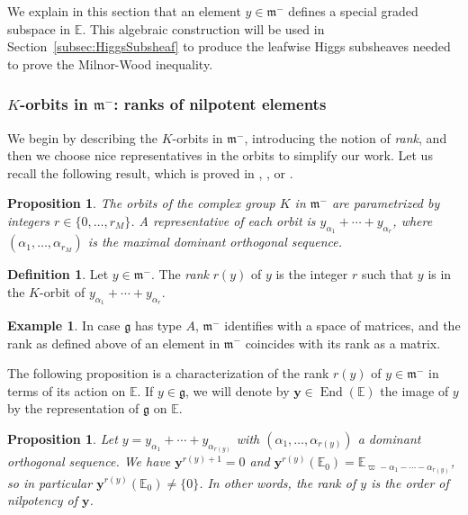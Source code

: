 \documentclass[JEP,XML,SOM,Unicode,NoFloatCountersInSection]{cedram}
\newcommand{\citestar}[3]{\cite[#3]{#1}}
\theoremstyle{plain}
\newtheorem{prop}[theo]{Proposition}
\theoremstyle{definition}
\newtheorem{defi}[theo]{Definition}
\newtheorem{exem}[theo]{Example}
\DeclareMathOperator{\End}{End}
\newcommand{\bE}{\mathbb{E}}
\newcommand{\by}{\boldsymbol{y}}
\newcommand{\fgg}{\mathfrak{g}}
\newcommand{\fm}{\mathfrak{m}}
\newcommand{\rkm}{{r_M}}
\newcommand{\rky}{{r(y)}}
\begin{document}
\label{subsec:higgs-submodule}

We explain in this section that an element $y\in\fm^-$ defines a special graded subspace in
$\bE$. This algebraic construction will be used in Section~\ref{subsec:HiggsSubsheaf} to produce
the leafwise Higgs subsheaves needed to prove the Milnor-Wood inequality.

\subsubsection{$K$-orbits in $\fm^-$: ranks of nilpotent elements}\label{subsubsec:rank}

We begin by describing the $K$\nobreakdash-orbits in $\fm^-$, introducing the notion of \emph{rank}, and then we
choose nice representatives in the orbits to simplify our work. Let us recall the following result, which is proved \eg in
\cite{Harish}, \hbox{\citestar{Helgason}*{Ch.\,VIII,\,}}, or \cite{WolfFineStructure}.

\begin{prop}
\label{prop:rank}
The orbits of the complex group $K$ in $\fm^-$ are parametrized by integers $r \in \{0,\ldots,\rkm\}$.
A representative of each orbit is $y_{\alpha_1} + \cdots + y_{\alpha_r}$, where $(\alpha_1,\ldots,\alpha_{r_M})$ is
the maximal dominant orthogonal sequence.
\end{prop}

\begin{defi}\label{defi:rank}
Let $y\in\fm^-$. The \emph{rank} $\rky$ of $y$ is the integer $r$ such that $y$ is in the $K$-orbit
of $y_{\alpha_1} + \cdots + y_{\alpha_r}$.
\end{defi}

\begin{exem}
\label{exem:matrices}
In case $\fgg$ has type $A$, $\fm^-$ identifies with a space of matrices, and
the rank as defined above of an element in $\fm^-$ coincides with its rank as a matrix.
\end{exem}

The following proposition is a characterization of the rank $\rky$ of $y\in\fm^-$ in terms
of its action on $\bE$. If $y\in\fgg$, we will denote by $\by\in\End(\bE)$ the image of $y$ by the
representation of $\fgg$ on $\bE$.

\begin{prop}
\label{prop:rang-y}
Let $y = y_{\alpha_1} + \cdots + y_{\alpha_\rky}$ with $(\alpha_1,\ldots,\alpha_\rky)$ a
dominant orthogonal sequence.
We have $\by^{\rky+1}=0$ and $\by^\rky(\bE_{0}) = \bE_{\varpi-\alpha_1-\cdots-\alpha_\rky}$, so
in particular $\by^\rky(\bE_{0}) \neq \{ 0 \}$.
In other words, the rank of $y$ is the order of nilpotency of $\by$.
\end{prop}
\end{document}

